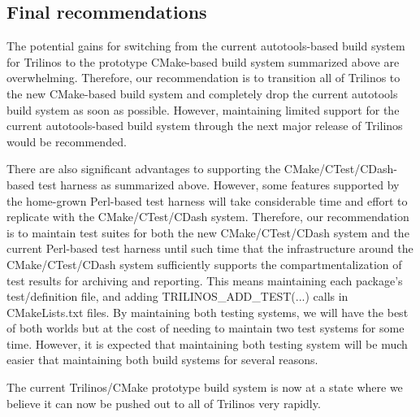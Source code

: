 \documentclass[pdf,ps2pdf,11pt]{SANDreport}
\begin{document}
%
\subsection{Final recommendations}
%

The potential gains for switching from the current autotools-based build
system for Trilinos to the prototype CMake-based build system
summarized above are overwhelming.  Therefore, our recommendation is
to transition all of Trilinos to the new CMake-based build system and
completely drop the current autotools build system as soon as
possible.  However, maintaining limited support for the current
autotools-based build system through the next major release of
Trilinos would be recommended.

There are also significant advantages to supporting the
CMake/CTest/CDash-based test harness as summarized above.  However,
some features supported by the home-grown Perl-based test harness will
take considerable time and effort to replicate with the
CMake/CTest/CDash system.  Therefore, our recommendation is to
maintain test suites for both the new CMake/CTest/CDash system and the
current Perl-based test harness until such time that the
infrastructure around the CMake/CTest/CDash system sufficiently
supports the compartmentalization of test results for archiving and
reporting.  This means maintaining each package's test/definition file,
and adding TRILINOS\_ADD\_TEST(...) calls in CMakeLists.txt files.  By
maintaining both testing systems, we will have the best of both worlds
but at the cost of needing to maintain two test systems for some time.
However, it is expected that maintaining both testing system will be
much easier that maintaining both build systems for several reasons.

The current Trilinos/CMake prototype build system is now at a state
where we believe it can now be pushed out to all of Trilinos very
rapidly.


%
\clearpage




%
\appendix

%


\begin{SANDdistribution}[NM]
\end{SANDdistribution}
\end{document}
